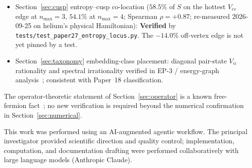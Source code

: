 \documentclass[twocolumn,pra,amsmath,amssymb,superscriptaddress]{revtex4-2}
\begin{document}
\begin{itemize}
  \item Section~\ref{sec:cusp} entropy--cusp co-location
    ($58.5\%$ of $S$ on the hottest $V_{ee}$ edge at $n_{\max}=3$,
    $54.1\%$ at $n_{\max}=4$; Spearman $\rho = +0.87$; re-measured
    2026-09-25 on helium's physical Hamiltonian): \textbf{Verified}
    by \texttt{tests/test\_paper27\_entropy\_locus.py}.  The
    $-14.0\%$ off-vertex edge is not yet pinned by a test.
  \item Section~\ref{sec:taxonomy} embedding-class placement:
    diagonal pair-state $V_{ii}$ rationality and spectral
    irrationality verified in EP-3 / energy-graph
    analysis~\cite{EnergyGraph}; consistent with Paper~18
    classification.
\end{itemize}

The operator-theoretic statement of Section~\ref{sec:operator}
is a known free-fermion fact~\cite{Peschel2003}; no new
verification is required beyond the numerical confirmation in
Section~\ref{sec:numerical}.


\begin{acknowledgments}
This work was performed using an AI-augmented agentic workflow.
The principal investigator provided scientific direction and
quality control; implementation, computation, and documentation
drafting were performed collaboratively with large language
models (Anthropic Claude).
\end{acknowledgments}

\end{document}
